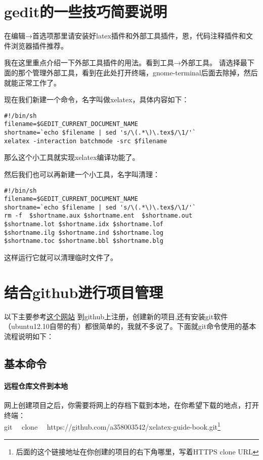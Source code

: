 \section{gedit的一些技巧简要说明}
在编辑→首选项那里请安装好latex插件和外部工具插件，恩，代码注释插件和文件浏览器插件推荐。

我在这里重点介绍一下外部工具插件的用法。看到工具→外部工具。
请选择最下面的那个管理外部工具，看到在此处打开终端，gnome-terminal后面去除掉，然后就能正常工作了。

现在我们新建一个命令，名字叫做xelatex，具体内容如下：
\begin{verbatim}
#!/bin/sh
filename=$GEDIT_CURRENT_DOCUMENT_NAME
shortname=`echo $filename | sed 's/\(.*\)\.tex$/\1/'`
xelatex -interaction batchmode -src $filename
\end{verbatim}
那么这个小工具就实现xelatex编译功能了。

然后我们也可以再新建一个小工具，名字叫清理：
\begin{verbatim}
#!/bin/sh
filename=$GEDIT_CURRENT_DOCUMENT_NAME
shortname=`echo $filename | sed 's/\(.*\)\.tex$/\1/'`
rm -f  $shortname.aux $shortname.ent  $shortname.out 
$shortname.lot $shortname.idx $shortname.lof 
$shortname.ilg $shortname.ind $shortname.log 
$shortname.toc $shortname.bbl $shortname.blg
\end{verbatim}
这样运行它就可以清理临时文件了。


\section{结合github进行项目管理}
以下主要参考\href{http://rogerdudler.github.io/git-guide/index.zh.html}{这个网站}
到github上注册，创建新的项目,还有安装git软件（ubuntu12.10自带的有）都很简单的，我就不多说了。下面就git命令使用的基本流程说明如下：
\subsection{基本命令}
\paragraph{远程仓库文件到本地}
网上创建项目之后，你需要将网上的存档下载到本地，在你希望下载的地点，打开终端：\\
git ~~clone ~~https://github.com/a358003542/xelatex-guide-book.git\footnote{后面的这个链接地址在你创建的项目的右下角哪里，写着HTTPS clone URL}

